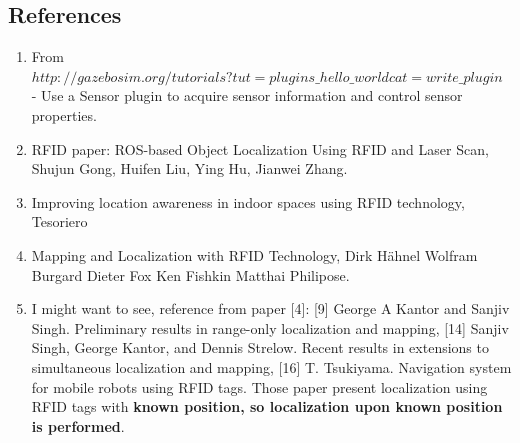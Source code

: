 \documentclass[11pt,a4paper]{article}
\begin{document}
\subsection{References}
\begin{enumerate}
\item From $http://gazebosim.org/tutorials?tut=plugins{\_}hello{\_}worldcat=write{\_}plugin$ - Use a Sensor plugin to acquire sensor information and control sensor properties.
\item RFID paper: ROS-based Object Localization Using RFID and Laser Scan, Shujun Gong, Huifen Liu, Ying Hu, Jianwei Zhang.
\item Improving location awareness in indoor spaces using RFID technology, Tesoriero
\item Mapping and Localization with RFID Technology, Dirk Hähnel Wolfram Burgard Dieter Fox Ken Fishkin Matthai Philipose.
\item I might want to see, reference from paper [4]: [9] George A Kantor and Sanjiv Singh. Preliminary results in range-only localization and mapping, [14] Sanjiv Singh, George Kantor, and Dennis Strelow. Recent results in extensions to simultaneous localization and mapping, [16] T. Tsukiyama. Navigation system for mobile robots using RFID tags. Those paper present localization using RFID tags with \textbf{known position, so localization upon known position is performed}.
\end{enumerate}
\end{document}
